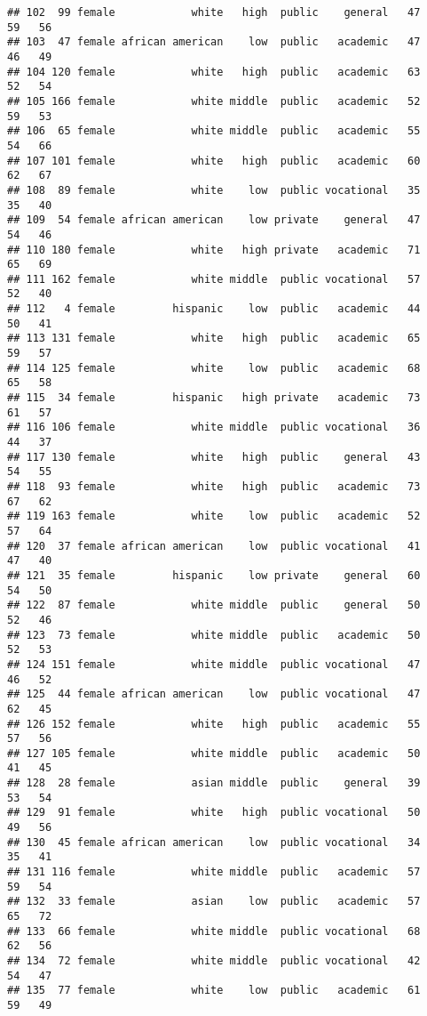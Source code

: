 \documentclass[
]{article}
\begin{document}
\begin{verbatim}
## 102  99 female            white   high  public    general   47    59   56
## 103  47 female african american    low  public   academic   47    46   49
## 104 120 female            white   high  public   academic   63    52   54
## 105 166 female            white middle  public   academic   52    59   53
## 106  65 female            white middle  public   academic   55    54   66
## 107 101 female            white   high  public   academic   60    62   67
## 108  89 female            white    low  public vocational   35    35   40
## 109  54 female african american    low private    general   47    54   46
## 110 180 female            white   high private   academic   71    65   69
## 111 162 female            white middle  public vocational   57    52   40
## 112   4 female         hispanic    low  public   academic   44    50   41
## 113 131 female            white   high  public   academic   65    59   57
## 114 125 female            white    low  public   academic   68    65   58
## 115  34 female         hispanic   high private   academic   73    61   57
## 116 106 female            white middle  public vocational   36    44   37
## 117 130 female            white   high  public    general   43    54   55
## 118  93 female            white   high  public   academic   73    67   62
## 119 163 female            white    low  public   academic   52    57   64
## 120  37 female african american    low  public vocational   41    47   40
## 121  35 female         hispanic    low private    general   60    54   50
## 122  87 female            white middle  public    general   50    52   46
## 123  73 female            white middle  public   academic   50    52   53
## 124 151 female            white middle  public vocational   47    46   52
## 125  44 female african american    low  public vocational   47    62   45
## 126 152 female            white   high  public   academic   55    57   56
## 127 105 female            white middle  public   academic   50    41   45
## 128  28 female            asian middle  public    general   39    53   54
## 129  91 female            white   high  public vocational   50    49   56
## 130  45 female african american    low  public vocational   34    35   41
## 131 116 female            white middle  public   academic   57    59   54
## 132  33 female            asian    low  public   academic   57    65   72
## 133  66 female            white middle  public vocational   68    62   56
## 134  72 female            white middle  public vocational   42    54   47
## 135  77 female            white    low  public   academic   61    59   49

\end{verbatim}
\end{document}
